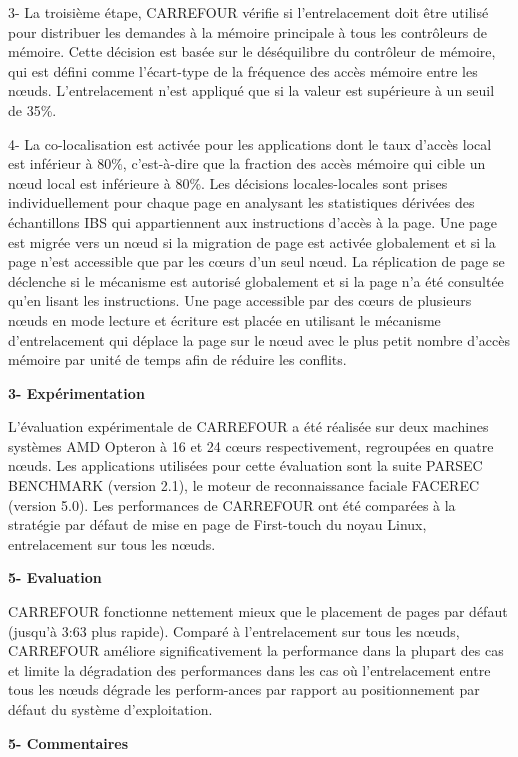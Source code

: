 3- La troisième étape, CARREFOUR vérifie si l'entrelacement doit être utilisé pour distribuer les demandes à la mémoire principale à tous les contrôleurs de mémoire. 
Cette décision est basée sur le déséquilibre du contrôleur de mémoire, qui est défini comme l'écart-type de la fréquence des accès mémoire entre les nœuds. 
L'entrelacement n'est appliqué que si la valeur est supérieure à un seuil de 35\%. 

4- La co-localisation est activée pour les applications dont le taux d'accès local est inférieur à 80\%, c'est-à-dire que la fraction des accès mémoire qui cible un nœud local est inférieure à 80\%. 
Les décisions locales-locales sont prises individuellement pour chaque page en analysant les statistiques dérivées des échantillons IBS qui appartiennent aux instructions d'accès à la page. 
Une page est migrée vers un nœud si la migration de page est activée globalement et si la page n'est accessible que par les cœurs d'un seul nœud. 
La réplication de page se déclenche si le mécanisme est autorisé globalement et si la page n'a été consultée qu'en lisant les instructions.
Une page accessible par des cœurs de plusieurs nœuds en mode lecture et écriture est placée en utilisant le mécanisme d'entrelacement qui déplace la page sur le nœud avec le plus petit nombre d'accès mémoire par unité de temps afin de réduire les conflits. 

\textbf{3- Expérimentation}

L'évaluation expérimentale de CARREFOUR a été réalisée sur deux machines systèmes AMD Opteron à 16 et 24 cœurs respectivement, regroupées en quatre nœuds. 
Les applications utilisées pour cette évaluation sont la suite PARSEC BENCHMARK (version 2.1), le moteur de reconnaissance faciale FACEREC (version 5.0).
Les performances de CARREFOUR ont été comparées à la stratégie par défaut de mise en page de First-touch du noyau Linux, entrelacement sur tous les nœuds.

\textbf{5- Evaluation} 

CARREFOUR fonctionne nettement mieux que le placement de pages par défaut (jusqu'à 3:63 plus rapide). 
Comparé à l'entrelacement sur tous les nœuds, CARREFOUR améliore significativement la performance dans la plupart des cas et 
limite la dégradation des performances dans les cas où l'entrelacement entre tous les nœuds dégrade les perform-ances par rapport au positionnement par défaut du système d'exploitation. 

\textbf{5- Commentaires}

